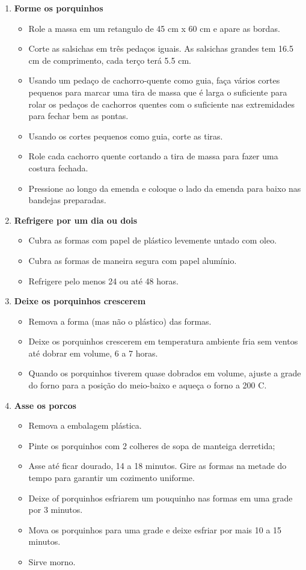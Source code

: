 \documentclass [11pt, papel de carta] {article}
\begin{document}
\begin {description}
\begin {enumerate}
\item {\bf Forme os porquinhos}
\begin {itemize}
\item Role a massa em um retangulo de 45 cm x 60 cm e apare as bordas.
\item Corte as salsichas em tr\^es peda\c{c}os iguais. As salsichas grandes tem 16.5 cm de comprimento, cada ter\c{c}o ter\'a 5.5 cm.
\item Usando um peda\c{c}o de cachorro-quente como guia, fa\c{c}a v\'arios cortes pequenos para marcar uma tira de massa que \'e larga o suficiente para rolar os peda\c{c}os de cachorros quentes com o suficiente nas extremidades para fechar bem as pontas.
\item Usando os cortes pequenos como guia, corte as tiras.
\item Role cada cachorro quente cortando a tira de massa para fazer uma costura fechada.
\item Pressione ao longo da emenda e coloque o lado da emenda para baixo nas bandejas preparadas.
\end {itemize}

\item {\bf Refrigere por um dia ou dois}
\begin {itemize}
\item Cubra as formas com papel de plástico levemente untado com oleo.
\item Cubra as formas de maneira segura com papel alumínio.
\item Refrigere pelo menos 24 ou até 48 horas.
\end {itemize}

\item {\bf Deixe os porquinhos crescerem}
\begin {itemize}
\item Remova a forma (mas não o plástico) das formas.
\item Deixe os porquinhos crescerem em temperatura ambiente fria sem ventos
 até dobrar em volume, 6 a 7 horas.
\item Quando os porquinhos tiverem quase dobrados em volume,
ajuste a grade do forno para a posição do meio-baixo e aqueça o forno a 200 C.
\end {itemize}

\item {\bf Asse os porcos}
\begin {itemize}
\item Remova a embalagem plástica.
\item Pinte os porquinhos com 2 colheres de sopa de manteiga derretida;
\item Asse até ficar dourado, 14 a 18 minutos. Gire as formas na metade do tempo para garantir um cozimento uniforme.
\item Deixe of porquinhos esfriarem um pouquinho nas formas em uma grade por 3 minutos.
\item Mova os porquinhos para uma grade e deixe esfriar por mais 10 a 15 minutos.
\item Sirve morno.
\end {itemize}
\end {enumerate}
\end {description}
\end{document}

